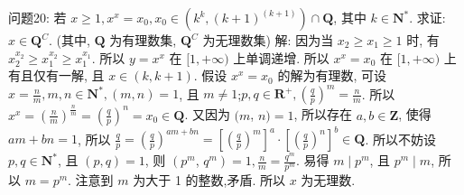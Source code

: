 问题20: 若 $x \geqslant 1, x^x=x_0, x_0 \in\left(k^k,(k+1)^{(k+1)}\right) \cap \mathbf{Q}$, 其中 $k \in \mathbf{N}^*$. 求证: $x \in \mathbf{Q}^C$. (其中, $\mathbf{Q}$ 为有理数集, $\mathbf{Q}^C$ 为无理数集)
解: 因为当 $x_2 \geqslant x_1 \geqslant 1$ 时, 有 $x_2^{x_2} \geqslant x_1^{x_2} \geqslant x_1^{x_1}$. 所以 $y=x^x$ 在 $[1,+\infty)$ 上单调递增.
所以 $x^x=x_0$ 在 $[1,+\infty)$ 上有且仅有一解, 且 $x \in(k, k+1)$. 假设 $x^x=x_0$ 的解为有理数, 可设 $x=\frac{n}{m}, m, n \in \mathbf{N}^*,(m, n)=1$, 且 $m \neq 1$;$p, q \in \mathbf{R}^{+},\left(\frac{q}{p}\right)^m=\frac{n}{m}$. 所以 $x^x=\left(\frac{n}{m}\right)^{\frac{n}{m}}=\left(\frac{q}{p}\right)^n=x_0 \in \mathbf{Q}$. 又因为 $(m$, $n)=1$, 所以存在 $a, b \in \mathbf{Z}$, 使得 $a m+b n=1$, 所以 $\frac{q}{p}=\left(\frac{q}{p}\right)^{a m+b n}= \left[\left(\frac{q}{p}\right)^m\right]^a \cdot\left[\left(\frac{q}{p}\right)^n\right]^b \in \mathbf{Q}$. 所以不妨设 $p, q \in \mathbf{N}^*$, 且 $(p, q)=1$, 则 $\left(p^m\right.$, $\left.q^m\right)=1, \frac{n}{m}=\frac{q^m}{p^m}$. 易得 $m \mid p^m$, 且 $p^m \mid m$, 所以 $m=p^m$. 注意到 $m$ 为大于 1 的整数,矛盾.
所以 $x$ 为无理数.


